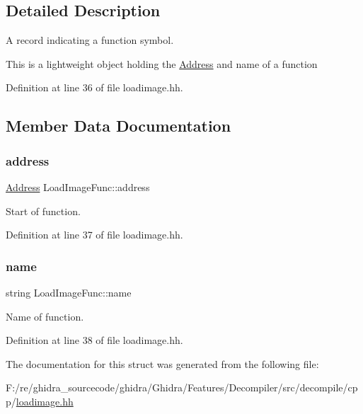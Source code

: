 \subsection{Detailed Description}
A record indicating a function symbol. 

This is a lightweight object holding the \mbox{\hyperlink{class_address}{Address}} and name of a function 

Definition at line 36 of file loadimage.\+hh.



\subsection{Member Data Documentation}
\mbox{\label{struct_load_image_func_a928751ffba76427337bb1e7e8e808cb3}} 
\subsubsection{\texorpdfstring{address}{address}}
{\footnotesize\ttfamily \mbox{\hyperlink{class_address}{Address}} Load\+Image\+Func\+::address}



Start of function. 



Definition at line 37 of file loadimage.\+hh.

\mbox{\label{struct_load_image_func_a1f3c54ce75f8f381ea597fa5f127a26c}} 
\subsubsection{\texorpdfstring{name}{name}}
{\footnotesize\ttfamily string Load\+Image\+Func\+::name}



Name of function. 



Definition at line 38 of file loadimage.\+hh.



The documentation for this struct was generated from the following file\+:\begin{DoxyCompactItemize}
\item 
F\+:/re/ghidra\+\_\+sourcecode/ghidra/\+Ghidra/\+Features/\+Decompiler/src/decompile/cpp/\mbox{\hyperlink{loadimage_8hh}{loadimage.\+hh}}\end{DoxyCompactItemize}
